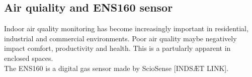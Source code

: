 \subsection{Air quiality and ENS160 sensor}
Indoor air quality monitoring has become increasingly important in residential, industrial and 
commercial environments. Poor air quality maybe negatively impact comfort, productivity and
health. This is a partularly apparent in enclosed spaces.\\
The ENS160 is a digital gas sensor made by ScioSense [INDSÆT LINK].